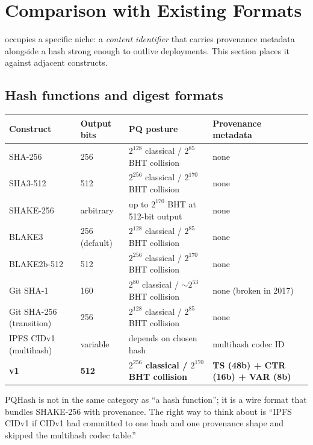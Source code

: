 \section{Comparison with Existing Formats}
\label{sec:comparison}

\pqhash{} occupies a specific niche: a \emph{content identifier} that carries provenance metadata alongside a hash strong enough to outlive deployments. This section places it against adjacent constructs.

\subsection{Hash functions and digest formats}

\begin{center}
\small
\begin{tabularx}{\textwidth}{@{}lXXX@{}}
\toprule
\textbf{Construct} & \textbf{Output bits} & \textbf{PQ posture} & \textbf{Provenance metadata} \\
\midrule
SHA-256                         & 256  & $2^{128}$ classical / $2^{85}$ BHT collision        & none \\
SHA3-512 \citep{fips202}        & 512  & $2^{256}$ classical / $2^{170}$ BHT collision       & none \\
SHAKE-256 \citep{fips202}       & arbitrary & up to $2^{170}$ BHT at 512-bit output           & none \\
BLAKE3                          & 256 (default) & $2^{128}$ classical / $2^{85}$ BHT collision  & none \\
BLAKE2b-512                     & 512  & $2^{256}$ classical / $2^{170}$ BHT collision       & none \\
Git SHA-1                       & 160  & $2^{80}$ classical / $\sim 2^{53}$ BHT collision    & none (broken in 2017) \\
Git SHA-256 (transition)        & 256  & $2^{128}$ classical / $2^{85}$ BHT collision        & none \\
IPFS CIDv1 (multihash)          & variable & depends on chosen hash                          & multihash codec ID \\
\textbf{\pqhash{} v1}           & \textbf{512} & \textbf{$2^{256}$ classical / $2^{170}$ BHT collision} & \textbf{TS (48b) + CTR (16b) + VAR (8b)} \\
\bottomrule
\end{tabularx}
\end{center}

PQHash is not in the same category as ``a hash function''; it is a wire format that bundles SHAKE-256 with provenance. The right way to think about \pqhash{} is ``IPFS CIDv1 if CIDv1 had committed to one hash and one provenance shape and skipped the multihash codec table.''

